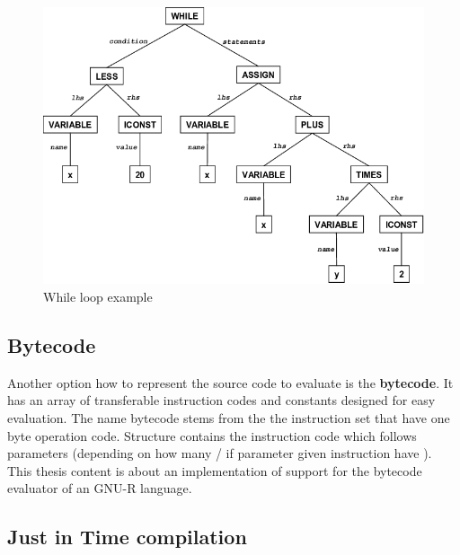 \documentclass[thesis=M,english]{FITthesis}[2018/10/20]
\begin{document}

\begin{figure}[hH!]\centering
	\includegraphics{Abstract-syntax-tree-of-the-while-loop}
	\caption{While loop example}\label{fig:ast-while}
\end{figure}

\subsection{Bytecode}\label{BC}

Another option how to represent the source code to evaluate is the \textbf{bytecode}. It has an array of transferable instruction codes and constants designed for easy evaluation. The name bytecode stems from the the instruction set that have one byte operation code. Structure contains the instruction code which follows parameters (depending on how many / if parameter given instruction have ). This thesis content is about an implementation of support for the bytecode evaluator of an GNU-R language.

\subsection{Just in Time compilation}\label{JIT}
\end{document}
